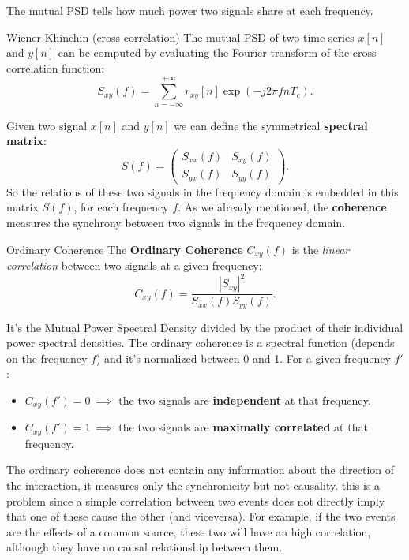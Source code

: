 \documentclass[10pt, letterpaper]{report}
\begin{document}
\noindent The mutual PSD tells how much power two signals share at each frequency.
\begin{boxtheorem}{Wiener-Khinchin (cross correlation)}{}
     The mutual PSD of two time series $x[n]$ and $y[n]$ can be computed by evaluating the Fourier transform of the cross correlation function:\begin{equation}
          S_{xy}(f)=\sum_{n=-\infty}^{+\infty}r_{xy}[n]\exp(-j2\pi fnT_c).
     \end{equation}
\end{boxtheorem}
\noindent Given two signal $x[n]$ and $y[n]$ we can define the symmetrical \textbf{spectral matrix}:\begin{equation}
     S(f)=\begin{pmatrix}
          S_{xx}(f)&S_{xy}(f)\\
          S_{yx}(f)&S_{yy}(f)
     \end{pmatrix}.
\end{equation}
So the relations of these two signals in the frequency domain is embedded in this matrix $S(f)$, for each frequency $f$.
As we already mentioned, the \textbf{coherence} measures the synchrony between two signals in the frequency domain.

\begin{boxdefinition}{Ordinary Coherence}{}
     The \textbf{Ordinary Coherence} $C_{xy}(f)$ is the \textit{linear correlation} between two signals at a given frequency:\begin{equation}
          C_{xy}(f)=\frac{|S_{xy}|^2}{S_{xx}(f)S_{yy}(f)}.
     \end{equation}
\end{boxdefinition}


It's the Mutual Power Spectral Density divided by the 
product of their individual power spectral densities. The ordinary coherence is a spectral function (depends on the frequency $f$) and it's normalized between 0 and 1. For a given frequency $f'$:\begin{itemize}
     \item $C_{xy}(f')=0 \ \implies$ the two signals are \textbf{independent} at that frequency.
     \item $C_{xy}(f')=1 \ \implies$ the two signals are \textbf{maximally correlated} at that frequency. 
\end{itemize}
The ordinary coherence does not contain any information about the direction of the interaction, it measures only the synchronicity but not causality. this is a problem since a simple correlation between two events does not directly imply that one of these cause the other (and viceversa). For example, if the two events are the effects of a common source, these two will have an high correlation, although they have no causal relationship between them.
\end{document}
